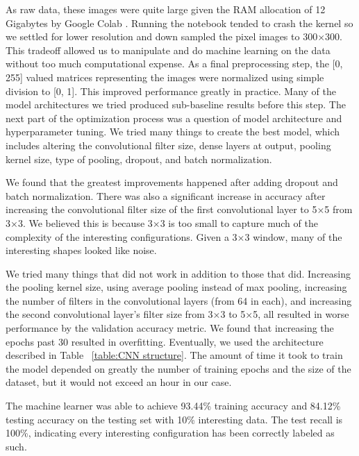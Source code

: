 \documentclass[12pt]{article}
\numberwithin{figure}{section} %
\begin{document}
As raw data, these images were quite large given the RAM allocation of 12 Gigabytes by Google Colab \cite{Google Colab}. Running the notebook tended to crash the kernel so we settled for lower resolution and down sampled the pixel images to 300×300. This tradeoff allowed us to manipulate and do machine learning on the data without too much computational expense. As a final preprocessing step, the [0, 255] valued matrices representing the images were normalized using simple division to [0, 1]. This improved performance greatly in practice. Many of the model architectures we tried produced sub-baseline results before this step. The next part of the optimization process was a question of model architecture and hyperparameter tuning. We tried many things to create the best model, which includes altering the convolutional filter size, dense layers at output, pooling kernel size, type of pooling, dropout, and batch normalization. 

We found that the greatest improvements happened after adding dropout and batch normalization. There was also a significant increase in accuracy after increasing the convolutional filter size of the first convolutional layer to 5×5 from 3×3. We believed this is because 3×3 is too small to capture much of the complexity of the interesting configurations. Given a 3×3 window, many of the interesting shapes looked like noise.

We tried many things that did not work in addition to those that did. Increasing the pooling kernel size, using average pooling instead of max pooling, increasing the number of filters in the convolutional layers (from 64 in each), and increasing the second convolutional layer’s filter size from 3×3 to 5×5, all resulted in worse performance by the validation accuracy metric. We found that increasing the epochs past 30 resulted in overfitting. Eventually, we used the architecture described in Table ~\ref{table:CNN structure}. The amount of time it took to train the model depended on greatly the number of training epochs and the size of the dataset, but it would not exceed an hour in our case. 

The machine learner was able to achieve 93.44\% training accuracy and 84.12\% testing accuracy on the testing set with 10\% interesting data. The test recall is 100\%, indicating every interesting configuration has been correctly labeled as such. 
\end{document}
